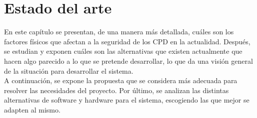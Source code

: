 \chapter{Estado del arte}
\label{ch:estado}
En este capítulo se presentan, de una manera más detallada, cuáles son los factores físicos que afectan a la seguridad de los CPD en la actualidad. Después, se estudian y exponen cuáles son las alternativas que existen actualmente que hacen algo parecido a lo que se pretende desarrollar, lo que da una visión general de la situación para desarrollar el sistema. \\ A continuación, se expone la propuesta que se considera más adecuada para resolver las necesidades del proyecto. Por último, se analizan las distintas alternativas de software y hardware para el sistema, escogiendo las que mejor se adapten al mismo.


